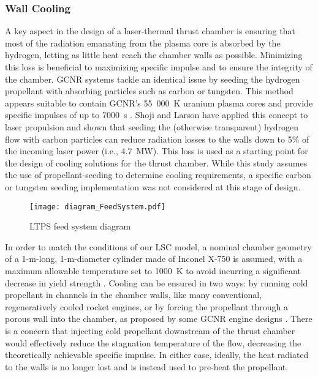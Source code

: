 \documentclass[final,3p,times,twocolumn,sort&compress, lefttitle]{elsarticle}
\begin{document}
            \subsubsection{Wall Cooling}
                A key aspect in the design of a laser-thermal thrust chamber is ensuring that most of the radiation emanating from the plasma core is absorbed by the hydrogen, letting as little heat reach the chamber walls as possible. Minimizing this loss is beneficial to maximizing specific impulse and to ensure the integrity of the chamber. GCNR systems tackle an identical issue by seeding the hydrogen propellant with absorbing particles such as carbon or tungsten. This method appears suitable to contain GCNR's 55~000~K uranium plasma cores and provide specific impulses of up to 7000~s \cite{ragsdale_high_1971, ragsdale_gas_1971}. Shoji and Larson \cite{shoji_performance_1976} have applied this concept to laser propulsion and shown that seeding the (otherwise transparent) hydrogen flow with carbon particles can reduce radiation losses to the walls down to 5\% of the incoming laser power (i.e., 4.7~MW). This loss is used as a starting point for the design of cooling solutions for the thrust chamber. While this study assumes the use of propellant-seeding to determine cooling requirements, a specific carbon or tungsten seeding implementation was not considered at this stage of design.
                
                \begin{figure*}[t]
                    \centering
                    \texttt{[image: diagram\_FeedSystem.pdf]}
                    \caption{LTPS feed system diagram}
                    \label{fig:feedsystem}
                \end{figure*}
                
                In order to match the conditions of our LSC model, a nominal chamber geometry of a 1-m-long, 1-m-diameter cylinder made of Inconel X-750 is assumed, with a maximum allowable temperature set to 1000~K to avoid incurring a significant decrease in yield strength \cite{special_metals_corporation_inconelalloy_2004}. Cooling can be ensured in two ways: by running cold propellant in channels in the chamber walls, like many conventional, regeneratively cooled rocket engines, or by forcing the propellant through a porous wall into the chamber, as proposed by some GCNR engine designs \cite{kascak_nozzle_1971}. There is a concern that injecting cold propellant downstream of the thrust chamber would effectively reduce the stagnation temperature of the flow, decreasing the theoretically achievable specific impulse. In either case, ideally, the heat radiated to the walls is no longer lost and is instead used to pre-heat the propellant.
                
\end{document}
